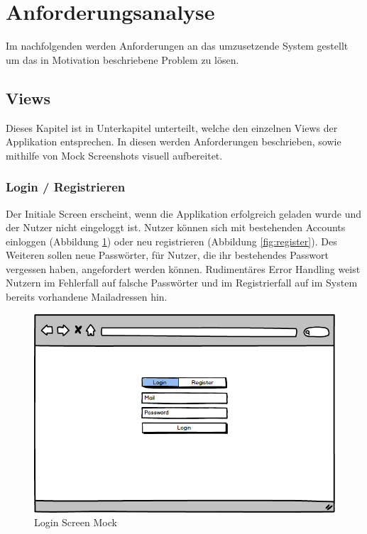 \section{Anforderungsanalyse}

Im nachfolgenden werden Anforderungen an das umzusetzende System gestellt um das in Motivation beschriebene Problem zu lösen.

\subsection{Views}

Dieses Kapitel ist in Unterkapitel unterteilt, welche den einzelnen Views der Applikation \projectname{} entsprechen.
In diesen werden Anforderungen beschrieben, sowie mithilfe von Mock Screenshots visuell aufbereitet.

\subsubsection{Login / Registrieren}

Der Initiale Screen erscheint, wenn die Applikation erfolgreich geladen wurde und der Nutzer nicht eingeloggt ist.
Nutzer können sich mit bestehenden Accounts einloggen (Abbildung \ref{fig:login}) oder neu registrieren (Abbildung \ref{fig:register}).
Des Weiteren sollen neue Passwörter, für Nutzer, die ihr bestehendes Passwort vergessen haben, angefordert werden können.
Rudimentäres Error Handling weist Nutzern im Fehlerfall auf falsche Passwörter und im Registrierfall auf
im System bereits vorhandene Mailadressen hin.

\begin{figure}[h]
 \centering
 \includegraphics[width=0.7\linewidth]{kapitel1/mocks/Login.png}
 \caption{Login Screen Mock}
  \label{fig:login}
\end{figure}

